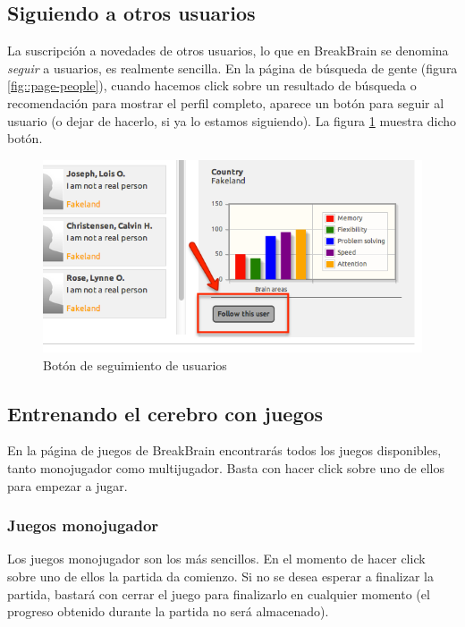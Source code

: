 \subsection{Siguiendo a otros usuarios}

La suscripción a novedades de otros usuarios, lo que en BreakBrain se denomina {\it seguir} a usuarios, es realmente sencilla. En la página de búsqueda de gente (figura \ref{fig::page-people}), cuando hacemos click sobre un resultado de búsqueda o recomendación para mostrar el perfil completo, aparece un botón para seguir al usuario (o dejar de hacerlo, si ya lo estamos siguiendo). La figura \ref{fig::follow-button} muestra dicho botón.

\begin{figure}[h]
  \begin{center}
    \includegraphics[width=\textwidth]{./images/follow-button.png}
  \end{center}  
  \caption{Botón de seguimiento de usuarios}
  \label{fig::follow-button}
\end{figure}

\subsection{Entrenando el cerebro con juegos}

En la página de juegos de BreakBrain encontrarás todos los juegos disponibles, tanto monojugador como multijugador. Basta con hacer click sobre uno de ellos para empezar a jugar.

\subsubsection{Juegos monojugador}

Los juegos monojugador son los más sencillos. En el momento de hacer click sobre uno de ellos la partida da comienzo. Si no se desea esperar a finalizar la partida, bastará con cerrar el juego para finalizarlo en cualquier momento (el progreso obtenido durante la partida no será almacenado).

